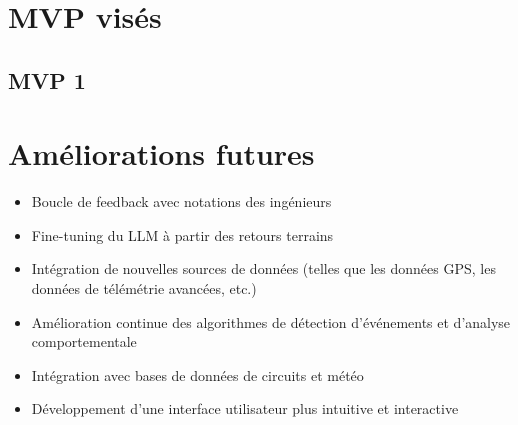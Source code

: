 \documentclass[a4paper,12pt]{report}
\begin{document}
\chapter{MVP visés}

\section{MVP 1}

\chapter{Améliorations futures}
\begin{itemize}
    \item Boucle de feedback avec notations des ingénieurs
    \item Fine-tuning du LLM à partir des retours terrains
    \item Intégration de nouvelles sources de données (telles que les données GPS, les données de télémétrie avancées, etc.)
    \item Amélioration continue des algorithmes de détection d'événements et d'analyse comportementale
    \item Intégration avec bases de données de circuits et météo
    \item Développement d'une interface utilisateur plus intuitive et interactive
\end{itemize}
\end{document}

